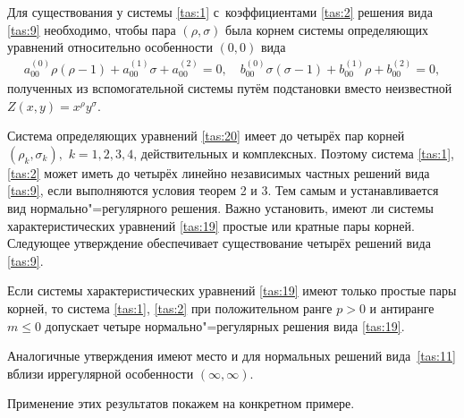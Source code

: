 \smallskip

\hypertarget{tasm:3}{}

\begin{theorem}[3]Для существования у системы \eqref{tas:1} с~коэффициентами \eqref{tas:2} решения вида \eqref{tas:9} необходимо{\rm ,} чтобы пара $(\rho, \sigma)$ была корнем системы определяющих уравнений
относительно особенности $(0, 0)$ вида
\begin{equation}
\begin{array}{l}
a_{00}^{(0)}   \rho(\rho-1)+a_{00}^{(1)}   \sigma+a_{00}^{(2)}=0, \quad 
b_{00}^{(0)}   \sigma(\sigma-1)+b_{00}^{(1)}  
\rho+b_{00}^{(2)}=0,
\end{array} 
\label{tas:20}
\end{equation}
полученных из вспомогательной системы путём подстановки вместо неизвестной $Z(x,y)=x^{\rho}   y^{\sigma}.$
\end{theorem}

\smallskip

Система определяющих уравнений \eqref{tas:20} имеет до четырёх пар корней \linebreak
$(\rho_{k}, \sigma_{k}),$ $k=1, 2, 3, 4$, действительных и
комплексных. Поэтому система \eqref{tas:1}, \eqref{tas:2} может иметь до четырёх
линейно независимых частных решений вида \eqref{tas:9}, если выполняются
условия теорем 2 и 3. Тем самым и устанавливается вид
нормально"=регулярного решения. Важно установить, имеют ли системы
характеристических уравнений \eqref{tas:19} простые или кратные пары корней.
Следующее утверждение обеспечивает существование четырёх решений
вида \eqref{tas:9}.

\smallskip

\begin{theorem}[4]Если системы характеристических уравнений \eqref{tas:19} имеют только простые пары корней{\rm ,} то система \eqref{tas:1}{\rm ,} \eqref{tas:2} при положительном ранге $p>0$ и антиранге $m\leq0$ допускает четыре нормально"=регулярных решения вида \eqref{tas:19}{\rm .}
\end{theorem}

\smallskip

Аналогичные утверждения имеют место и для нормальных решений вида~\eqref{tas:11} вблизи иррегулярной особенности $(\infty, \infty)$.


Применение этих результатов покажем на конкретном примере.

\smallskip

